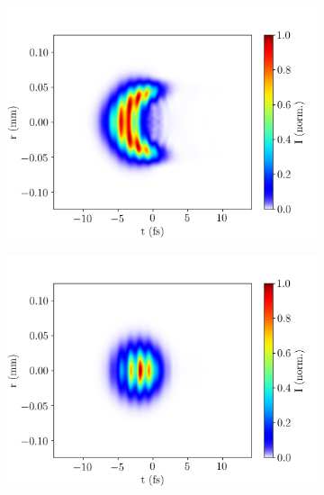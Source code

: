 \documentclass[a4paper]{jpconf}
\begin{document}
\begin{figure}[h]
\centering
 \begin{subfigure}{0.49\textwidth}
        \includegraphics[width=\textwidth]{im/UV_pulse_output_Ar_ion}
    \caption{}
    \end{subfigure}
    \begin{subfigure}{0.49\textwidth}
        \includegraphics[width=\textwidth]{im/UV_pulse_output_Ar_no_ion}
    \caption{}
    \end{subfigure}   
     \begin{subfigure}{0.49\textwidth}

\end{subfigure}
\end{figure}
\end{document}

